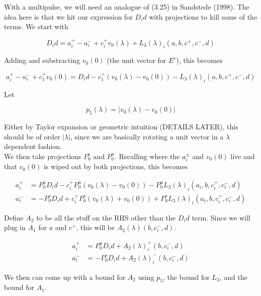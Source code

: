 \documentclass[12pt]{article}
\begin{document}
\begin{enumerate}
With a multipulse, we will need an analogue of (3.25) in Sandstede (1998). The idea here is that we hit our expression for $D_i d$ with projections to kill some of the terms. We start with

\[
D_i d = a_i^+ - a_i^- + c_i^+ v_0(\lambda) + L_3(\lambda)_i(a, b, c^+, c^-, d)
\]

Adding and substracting $v_0(0)$ (the unit vector for $E^c$), this becomes

\[
a_i^+ - a_i^- + c_1^+ v_0(0) = D_i d - c_1^+ (v_0(\lambda) - v_0(0)) - L_3(\lambda)_i(a, b, c^+, c^-, d)
\]

Let 

\[
p_5(\lambda) = |v_0(\lambda) - v_0(0)| 
\]

Either by Taylor expansion or geometric intuition (DETAILS LATER), this should be of order $|\lambda|$, since we are basically rotating a unit vector in a $\lambda$ dependent fashion.\\

We then take projections $P^s_0$ and $P^u_0$. Recalling where the $a_i^\pm$ and $v_0(0)$ live and that $v_0(0)$ is wiped out by both projections, this becomes 

\begin{align*}
a_i^+ &= P^u_0 D_i d - c_i^+ P^u_0 (v_0(\lambda) - v_0(0)) - P^u_0 L_3(\lambda)_i(a_i, b, c_i^+, c_i^-, d) \\
a_i^- &= -P^s_0 D_i d + c_i^+ P^s_0 (v_0(\lambda) + v_0(0)) + P^s_0 L_3(\lambda)_i(a_i, b, c_i^+, c_i^-, d)
\end{align*}

Define $A_2$ to be all the stuff on the RHS other than the $D_i d$ term. Since we will plug in $A_1$ for $a$ and $c^+$, this will be $A_2(\lambda)(b, c_i^-, d)$.

\begin{align*}
a_i^+ &= P^u_0 D_i d + A_2(\lambda)_i^+(b, c_i^-, d) \\
a_i^- &= -P^s_0 D_i d + A_2(\lambda)_i^-(b, c_i^-, d)
\end{align*}

We then can come up with a bound for $A_2$ using $p_5$, the bound for $L_3$, and the bound for $A_1$.


\end{enumerate}
\end{document}
